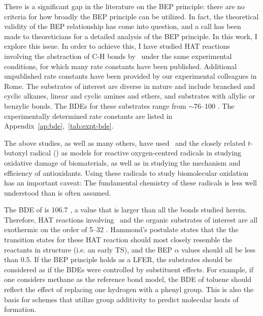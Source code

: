 There is a significant gap in the literature on the BEP principle: there are no
criteria for how broadly the BEP principle can be utilized. In fact, the
theoretical validity of the BEP relationship has come into question, and a call
has been made to theoreticians for a detailed analysis of the BEP
principle.\cite{vanSanten2010} In this work, I explore this issue. In order to
achieve this, I have studied HAT reactions involving the abstraction of C-H
bonds by \cumo\ under the same experimental conditions, for which many rate
constants have been published.\cite{Bietti2010, Bietti2011, Pischel2001,
Salamone2011, Salamone2012, Salamone2012a, Salamone2013, Salamone2015}
Additional unpublished rate constants have been provided by our experimental
colleagues in Rome. The substrates of interest are diverse in nature and
include branched and cyclic alkanes, linear and cyclic amines and ethers, and
substrates with allylic or benzylic  bonds. The BDEs for these
substrates range from $\sim$76--100 \kcalmol. The experimentally determined
rate constants are listed in Appendix~\ref{ap:bde},~\ref{tab:expt-bde}.

The above studies, as well as many others, have used \cumo\ and the closely
related $t$-butoxyl radical () as models for reactive
oxygen-centred radicals in studying oxidative damage of
biomaterials,\cite{Adam1998, Adam2002, Jones2003} as well as in studying the
mechanism and efficiency of antioxidants.\cite{MacFaul1996, Valgimigli1996,
Valgimigli1999, Jovanovic1999, Sortino2003} Using these radicals to study
biomolecular oxidation has an important caveat: The fundamental chemistry of
these radicals is less well understood than is often assumed. \cite{Tanko2001,
Finn2004, Salamone2011b}

The BDE of  is 106.7 \kcalmol, a value that is larger than all the
 bonds studied herein. Therefore, HAT reactions involving \cumo\ and the organic substrates
of interest are all exothermic on the order of 5--32 \kcalmol. Hammond's
postulate\cite{Hammond1955} states that the the transition states for these HAT
reaction should most closely resemble the reactants in structure (i.e.  an
early TS), and the BEP $\alpha$ values should all be less than
0.5.\cite{Russell1973} If the BEP principle holds as a LFER, the substrates
should be considered as if the BDEs were controlled by substituent effects. For
example, if one considers methane as the reference  bond model, the BDE
of toluene should reflect the effect of replacing one hydrogen with a phenyl
group. This is also the basis for schemes that utilize group additivity to
predict molecular heats of formation.\cite{Benson1976}

